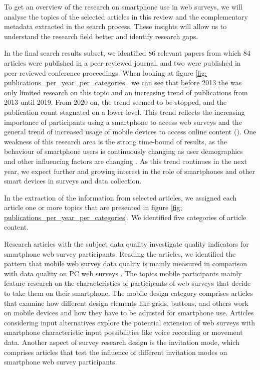 To get an overview of the research on smartphone use in web surveys, we will analyse the topics of the selected articles in this review and the complementary metadata extracted in the search process. These insights will allow us to understand the research field better and identify research gaps. 

In the final search results subset, we identified 86 relevant papers from which 84 articles were published in a peer-reviewed journal, and two were published in peer-reviewed conference proceedings. When looking at figure \ref{fig: publications_per_year_per_categories}, we can see that before 2013 the was only limited research on this topic and an increasing trend of publications from 2013 until 2019. From 2020 on, the trend seemed to be stopped, and the publication count stagnated on a lower level. This trend reflects the increasing importance of participants using a smartphone to access web surveys and the general trend of increased usage of mobile devices to access online content (\cite{weigold_computerized_2021}). One weakness of this research area is the strong time-bound of results, as the behaviour of smartphone users is continuously changing as user demographics and other influencing factors are changing \cite{brohl_desktop_2018}. As this trend continues in the next year, we expect further and growing interest in the role of smartphones and other smart devices in surveys and data collection.  

In the extraction of the information from selected articles, we assigned each article one or more topics that are presented in figure \ref{fig: publications_per_year_per_categories}. We identified five categories of article content.

Research articles with the subject data quality investigate quality indicators for smartphone web survey participants. Reading the articles, we identified the pattern that mobile web survey data quality is mainly measured in comparison with data quality on PC web surveys \cite{de_bruijne_comparing_2013, ha_data_2020}. The topics mobile participants mainly feature research on the characteristics of participants of web surveys that decide to take them on their smartphone. The mobile design category comprises articles that examine how different design elements like grids, buttons, and others work on mobile devices and how they have to be adjusted for smartphone use. Articles considering input alternatives explore the potential extension of web surveys with smartphone characteristic input possibilities like voice recording or movement data. Another aspect of survey research design is the invitation mode, which comprises articles that test the influence of different invitation modes on smartphone web survey participants. 

